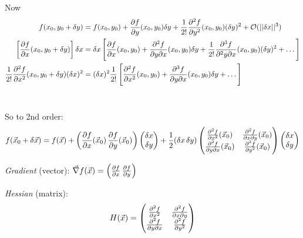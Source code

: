 \documentclass[10pt]{scrartcl}
\begin{document}
Now 
\setlength{\jot}{10pt}
\[
\begin{aligned}
f(x_0, y_0 + \delta y)&= f(x_0,y_0) + \frac{\partial f}{\partial y}(x_0,y_0)\delta y + \frac{1}{2!}\frac{\partial^2f}{\partial y^2}(x_0,y_0)(\delta y)^2 + \mathcal{O}(||\delta x||^3)\\
\left[\frac{\partial f}{\partial x}(x_0,y_0 + \delta y)\right]\delta x &= \delta x\left[\frac{\partial f}{\partial x}(x_0,y_0) + \frac{\partial^2f}{\partial y \partial x}(x_0,y_0)\delta y + \frac{1}{2!}\frac{\partial^3f}{\partial^2y\partial x}(x_0,y_0)(\delta y)^2 + \dots\right]\\
\frac{1}{2!}\frac{\partial^2f}{\partial x^2}(x_0,y_0+\delta y)(\delta x)^2 &= (\delta x)^2\frac{1}{2!}\left[\frac{\partial^2f}{\partial x^2}(x_0,y_0) + \frac{\partial^3f}{\partial y\partial x}(x_0,y_0)\delta y + \dots \right]
\end{aligned}\]~

So to 2nd order:
\[f(\vec{x}_0 + \delta \vec{x}) = f(\vec{x}) + \left(\frac{\partial f}{\partial x}(\vec{x}_0)\,\frac{\partial f}{\partial y}(\vec{x}_0)\right)\begin{pmatrix}
\delta x\\ \delta y	
\end{pmatrix}
+ \frac{1}{2}(\delta x\,\delta y)
\begin{pmatrix}
	\frac{\partial^2f}{\partial x^2}(\vec{x}_0) & \frac{\partial^2f}{\partial x\partial y}(\vec{x}_0)\\
	\frac{\partial^2f}{\partial y\partial x}(\vec{x}_0) & \frac{\partial^2f}{\partial y^2}(\vec{x}_0)
\end{pmatrix}
\begin{pmatrix}
\delta x\\ \delta y	
\end{pmatrix}
\]

\begin{definition}
\emph{Gradient} (vector): $\vec{\nabla}f(\vec{x}) = \left(\frac{\partial f}{\partial x}\, \frac{\partial f}{\partial y}\right)$

\emph{Hessian} (matrix): 
\[H(\vec{x}) = \begin{pmatrix}
	\frac{\partial^2f}{\partial x^2} & \frac{\partial^2f}{\partial x\partial y}\\
	\frac{\partial^2f}{\partial y\partial x} & \frac{\partial^2f}{\partial y^2}
\end{pmatrix}\]
\end{definition}
\end{document}
